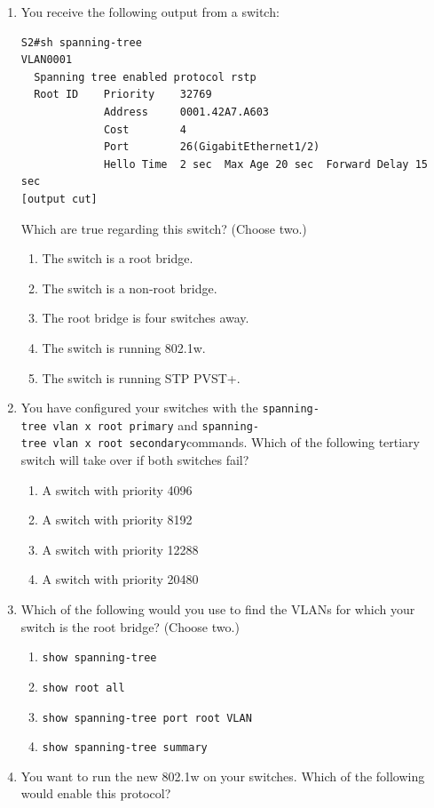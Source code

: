 \begin{enumerate}
\item
  You receive the following output from a switch:

\begin{verbatim}
S2#sh spanning-tree
VLAN0001
  Spanning tree enabled protocol rstp
  Root ID    Priority    32769
             Address     0001.42A7.A603
             Cost        4
             Port        26(GigabitEthernet1/2)
             Hello Time  2 sec  Max Age 20 sec  Forward Delay 15 sec
[output cut]
\end{verbatim}

  Which are true regarding this switch? (Choose two.)

  \begin{enumerate}
  \tightlist
  \item
    The switch is a root bridge.
  \item
    The switch is a non-root bridge.
  \item
    The root bridge is four switches away.
  \item
    The switch is running 802.1w.
  \item
    The switch is running STP PVST+.
  \end{enumerate}
\item
  You have configured your switches with the
  \texttt{spanning-tree\ vlan\ x\ root\ primary} and
  \texttt{spanning-tree\ vlan\ x\ root\ secondary}commands. Which of the
  following tertiary switch will take over if both switches fail?

  \begin{enumerate}
  \tightlist
  \item
    A switch with priority 4096
  \item
    A switch with priority 8192
  \item
    A switch with priority 12288
  \item
    A switch with priority 20480
  \end{enumerate}
\item
  Which of the following would you use to find the VLANs for which your
  switch is the root bridge? (Choose two.)

  \begin{enumerate}
  \tightlist
  \item
    \texttt{show\ spanning-tree}
  \item
    \texttt{show\ root\ all}
  \item
    \texttt{show\ spanning-tree\ port\ root\ VLAN}
  \item
    \texttt{show\ spanning-tree\ summary}
  \end{enumerate}
\item
  You want to run the
  new 802.1w on your switches. Which of the following would enable this
  protocol?


\end{enumerate}
